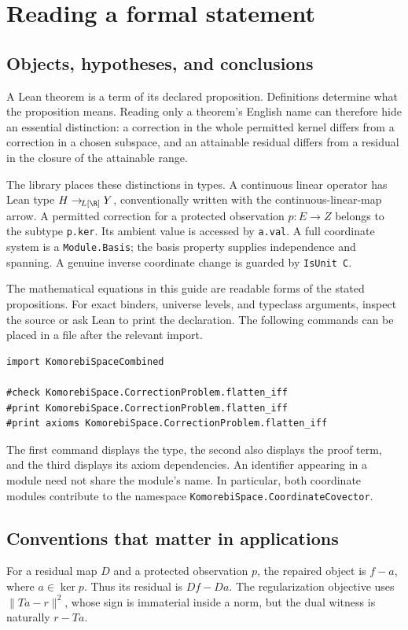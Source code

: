 \documentclass[11pt]{article}
\newcommand{\leanname}[1]{{\small\ttfamily\nolinkurl{#1}}}
\newcommand{\guidechapter}[1]{\par\Needspace{8\baselineskip}\section{#1}}
\begin{document}
\guidechapter{Reading a formal statement}
\subsection{Objects, hypotheses, and conclusions}
A Lean theorem is a term of its declared proposition. Definitions determine what the proposition means. Reading only a theorem's English name can therefore hide an essential distinction: a correction in the whole permitted kernel differs from a correction in a chosen subspace, and an attainable residual differs from a residual in the closure of the attainable range.

The library places these distinctions in types. A continuous linear operator has Lean type $H\to_{\!L[\R]}Y$, conventionally written with the continuous-linear-map arrow. A permitted correction for a protected observation $p:E\to Z$ belongs to the subtype \leanname{p.ker}. Its ambient value is accessed by \leanname{a.val}. A full coordinate system is a \leanname{Module.Basis}; the basis property supplies independence and spanning. A genuine inverse coordinate change is guarded by \leanname{IsUnit C}.

The mathematical equations in this guide are readable forms of the stated propositions. For exact binders, universe levels, and typeclass arguments, inspect the source or ask Lean to print the declaration. The following commands can be placed in a file after the relevant import.
\begin{verbatim}
import KomorebiSpaceCombined

#check KomorebiSpace.CorrectionProblem.flatten_iff
#print KomorebiSpace.CorrectionProblem.flatten_iff
#print axioms KomorebiSpace.CorrectionProblem.flatten_iff
\end{verbatim}
The first command displays the type, the second also displays the proof term, and the third displays its axiom dependencies. An identifier appearing in a module need not share the module's name. In particular, both coordinate modules contribute to the namespace \leanname{KomorebiSpace.CoordinateCovector}.

\subsection{Conventions that matter in applications}
For a residual map $D$ and a protected observation $p$, the repaired object is $f-a$, where $a\in\ker p$. Thus its residual is $Df-Da$. The regularization objective uses $\|Ta-r\|^2$, whose sign is immaterial inside a norm, but the dual witness is naturally $r-Ta$.
\end{document}
